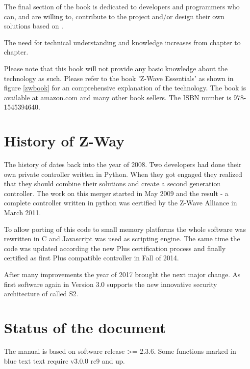 The final section of the book is dedicated to developers and programmers who can, and are 
willing to, contribute to the project and/or design their own solutions based on \zway.

The need for technical understanding and knowledge increases from chapter to chapter.

Please note that this book will not provide any basic knowledge about the \zwave technology
as such. Please
refer to the book 'Z-Wave Essentials' as shown in figure \ref{zwbook} for an comprehensive
explanation of the \zwave technology. The book is available at amazon.com and many other 
book sellers. The ISBN number is 978-1545394640.


\section{History of Z-Way}

The history of \zway dates back into the year of 2008. Two developers had done their own
private \zwave controller written in Python. When they got engaged they realized that
they should combine their solutions and create a second generation \zwave controller.
The work on this merger started in May 2009 and the result - a complete \zwave controller 
written in python was certified by the Z-Wave Alliance in March 2011.


To allow porting of this code to small memory platforms the whole software was rewritten
in C and Javascript was used as scripting engine. The same time the code was updated according 
the new \zwave Plus certification process and finally certified as first \zwave Plus 
compatible controller in Fall of 2014.
 
 
After many improvements the year of 2017 brought the next major change. As first software 
again \zway in Version 3.0 supports the new innovative security architecture of \zwave 
called S2.

\section{Status of the document}

The manual is based on \zway software release >= 2.3.6. Some functions marked in blue text
text require \zway v3.0.0 rc9 and up.
